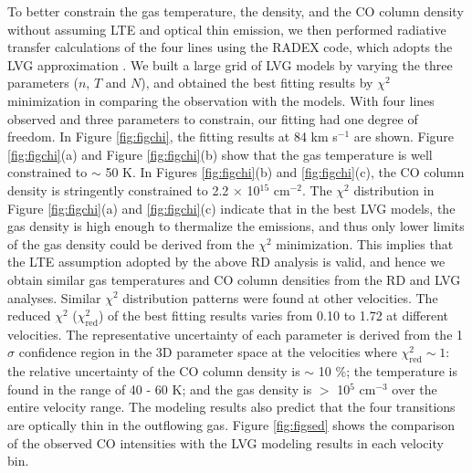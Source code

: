 To better constrain the gas temperature, the density, and the CO column density without assuming LTE and optical thin emission, we then performed radiative transfer calculations of the four lines using the RADEX code, which adopts the LVG approximation \citep{2007A&A...468..627V}. We built a large grid of LVG models by varying the three parameters ($n$, $T$ and $N$), and obtained the best fitting results by $\chi^2$ minimization in comparing the observation with the models. With four lines observed and three parameters to constrain, our fitting had one degree of freedom. In Figure \ref{fig:figchi}, the fitting results at 84 km s$^{-1}$ are shown. Figure \ref{fig:figchi}(a) and Figure \ref{fig:figchi}(b) show that the gas temperature is well constrained to $\sim$ 50 K. In Figures \ref{fig:figchi}(b) and \ref{fig:figchi}(c), the CO column density is stringently constrained to 2.2 $\times$ 10$^{15}$ cm$^{-2}$. The $\chi^2$ distribution in Figure \ref{fig:figchi}(a) and \ref{fig:figchi}(c) indicate that in the best LVG models, the gas density is high enough to thermalize the emissions, and thus only lower limits of the gas density could be derived from the $\chi^2$ minimization. This implies that the LTE assumption adopted by the above RD analysis is valid, and hence we obtain similar gas temperatures and CO column densities from the RD and LVG analyses. Similar $\chi^2$ distribution patterns were found at other velocities. The reduced $\chi^2$ ($\chi^2_{\mathrm{red}}$) of the best fitting results varies from 0.10 to 1.72 at different velocities. The representative uncertainty of each parameter is derived from the 1$\sigma$ confidence region in the 3D parameter space at the velocities where $\chi^2_{\mathrm{red}} \sim 1$: the relative uncertainty of the CO column density is $\sim$ 10 \%; the temperature is found in the range of 40 - 60 K; and the gas density is $>$ 10$^5$ cm$^{-3}$ over the entire velocity range. The modeling results also predict that the four transitions are optically thin in the outflowing gas. Figure \ref{fig:figsed} shows the comparison of the observed CO intensities with the LVG modeling results in each velocity bin. 



